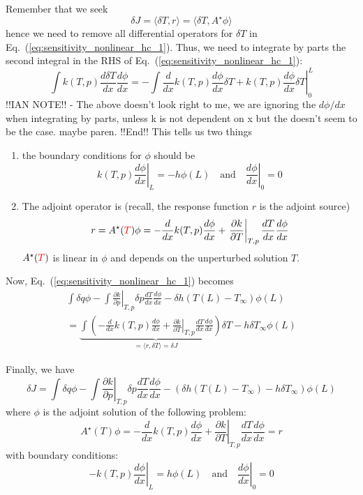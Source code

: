 \documentclass[11pt]{article}
\newcommand{\eqt}[1]{Eq.~(\ref{#1})}                     %
\newcommand{\be}{\begin{equation}}
\newcommand{\ee}{\end{equation}}
\newcommand{\tcr}[1]{\textcolor{red}{#1}}
\begin{document}
Remember that we seek 
\[
\delta J = \langle \delta T, r \rangle = \langle \delta T, A^\star \phi \rangle 
\]
hence we need to remove all differential operators for $\delta T$ in \eqt{eq:sensitivity_nonlinear_hc_1}. Thus, we need to integrate by parts the second integral in the RHS of \eqt{eq:sensitivity_nonlinear_hc_1}:
\[
\int k(T,p)\frac{d\delta T}{dx}\frac{d\phi}{dx} 
=
-\int \frac{d}{dx}k(T,p)\frac{d\phi}{dx} \delta T + \left.k(T,p)\frac{d\phi}{dx}\delta T\right|_0^L
\]
!!IAN NOTE!! - The above doesn't look right to me, we are ignoring the $d \phi /dx$ when integrating by parts, unless k is not dependent on x but the doesn't seem to be the case. maybe paren. !!End!!
This tells us two things
\begin{enumerate}
\item the boundary conditions for $\phi$ should be
\[
\left.k(T,p)\frac{d\phi}{dx}\right|_L = -h\phi(L) \quad \text{and} \quad \left.\frac{d\phi}{dx}\right|_0 = 0
\]
\item The adjoint operator is (recall, the response function $r$ is the adjoint source)
\[
r=A^\star(\tcr{T}) \phi  = -\frac{d}{dx}k(T,p)\frac{d\phi}{dx} + \left.\frac{\partial k}{\partial T}\right|_{T,p} \frac{dT}{dx}\frac{d\phi}{dx} 
\]
$A^\star(\tcr{T})$ is linear in $\phi$ and depends on the unperturbed solution $T$.
\end{enumerate}

Now, \eqt{eq:sensitivity_nonlinear_hc_1} becomes
\begin{multline}
\int \delta q\phi 
-\int \left.\frac{\partial k}{\partial p}\right|_{T,p}\delta p \frac{dT}{dx}\frac{d\phi}{dx} 
-\delta h(T(L)-T_\infty)  \phi(L)
\\=
\underbrace{
\int \left(
- \frac{d}{dx}k(T,p)\frac{d\phi}{dx} 
+ \left.\frac{\partial k}{\partial T}\right|_{T,p} \frac{dT}{dx}\frac{d\phi}{dx} 
\right) 
\delta T 
}
_{=\langle r,\delta T \rangle = \delta J}
-h\delta T_\infty \phi(L)
\end{multline}

Finally, we have
\be
\boxed{
\delta J = 
\int \delta q\phi 
-\int \left.\frac{\partial k}{\partial p}\right|_{T,p}\delta p \frac{dT}{dx}\frac{d\phi}{dx} 
-\left(\delta h(T(L)-T_\infty)  - h\delta T_\infty \right)\phi(L)
}
\ee
where $\phi$ is the adjoint solution of the following problem:
\[
A^\star(T) \phi  = -\frac{d}{dx}k(T,p)\frac{d\phi}{dx} + \left.\frac{\partial k}{\partial T}\right|_{T,p} \frac{dT}{dx}\frac{d\phi}{dx} = r
\]
with boundary conditions:
\[
-\left.k(T,p)\frac{d\phi}{dx}\right|_L = h\phi(L) \quad \text{and} \quad \left.\frac{d\phi}{dx}\right|_0 = 0
\]
\end{document}
